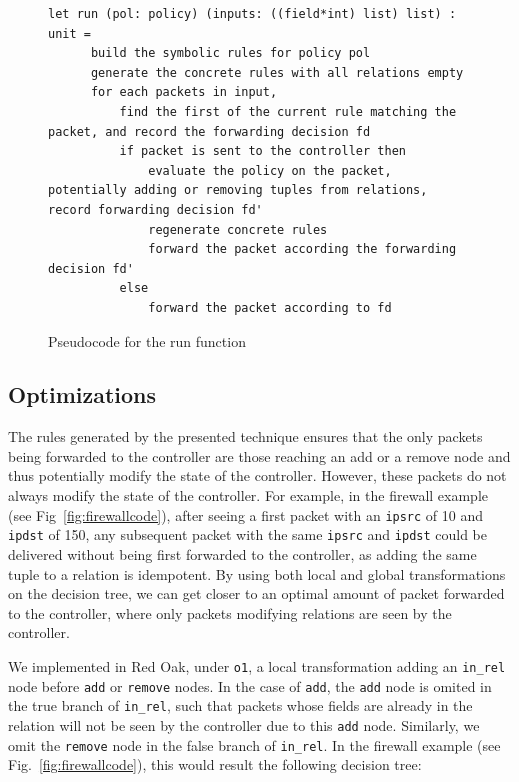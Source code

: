 \documentclass[preprint]{sigplanconf}
\begin{document}
\begin{figure}[ht]
\begin{lstlisting}
let run (pol: policy) (inputs: ((field*int) list) list) : unit =
      build the symbolic rules for policy pol
      generate the concrete rules with all relations empty
      for each packets in input,
          find the first of the current rule matching the packet, and record the forwarding decision fd
          if packet is sent to the controller then
              evaluate the policy on the packet, potentially adding or removing tuples from relations, record forwarding decision fd'
              regenerate concrete rules
              forward the packet according the forwarding decision fd'
          else
              forward the packet according to fd 
\end{lstlisting}

\caption{Pseudocode for the run function}
\label{fig:run-pseudo}
  \end{figure}



\subsection*{Optimizations}
The rules generated by the presented technique ensures that the only packets being forwarded to the controller are those reaching an add or a remove node and thus potentially modify the state of the controller. However, these packets do not always modify the state of the controller. For example, in the firewall example (see Fig~\ref{fig:firewallcode}), after seeing a first packet with an \lstinline|ipsrc| of 10 and \lstinline|ipdst| of 150, any subsequent packet with the same \lstinline|ipsrc| and \lstinline|ipdst| could be delivered without being first forwarded to the controller, as adding the same tuple to a relation is idempotent. By using both local and global transformations on the decision tree, we can get closer to an optimal amount of packet forwarded to the controller, where only packets modifying relations are seen by the controller.

We implemented in Red Oak, under \lstinline|o1|, a local transformation adding an \lstinline|in_rel| node before \lstinline|add| or \lstinline|remove| nodes. In the case of \lstinline|add|, the \lstinline|add| node is omited in the true branch of \lstinline|in_rel|, such that packets whose fields are already in the relation will not be seen by the controller due to this \lstinline|add| node. Similarly, we omit the \lstinline|remove| node in the false branch of \lstinline|in_rel|. In the firewall example (see Fig.~\ref{fig:firewallcode}), this would result the following decision tree:
\end{document}
